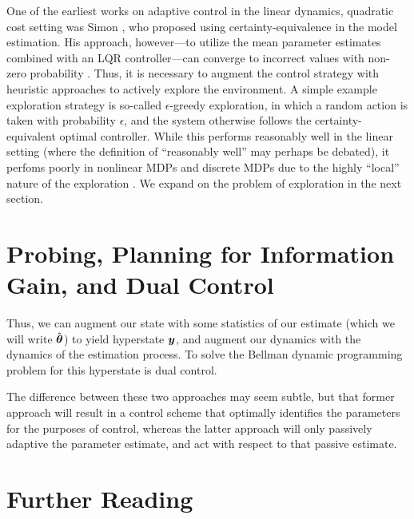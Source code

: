 One of the earliest works on adaptive control in the linear dynamics, quadratic cost setting was Simon \cite{simon1956dynamic}, who proposed using certainty-equivalence in the model estimation. His approach, however---to utilize the mean parameter estimates combined with an LQR controller---can converge to incorrect values with non-zero probability \cite{becker1985adaptive,abbasi2011regret}. Thus, it is necessary to augment the control strategy with heuristic approaches to actively explore the environment. A simple example exploration strategy is so-called $\epsilon$-greedy exploration, in which a random action is taken with probability $\epsilon$, and the system otherwise follows the certainty-equivalent optimal controller. While this performs reasonably well in the linear setting (where the definition of ``reasonably well'' may perhaps be debated), it perfoms poorly in nonlinear MDPs and discrete MDPs due to the highly ``local'' nature of the exploration \cite{moldovan2015optimism,osband2016generalization}. We expand on the problem of exploration in the next section. 




\section{Probing, Planning for Information Gain, and Dual Control}

Thus, we can augment our state with some statistics of our estimate (which we will write $\hat{\bm{\theta}}$) to yield hyperstate $\bm{y}$, and augment our dynamics with the dynamics of the estimation process. To solve the Bellman dynamic programming problem for this hyperstate is dual control. 

The difference between these two approaches may seem subtle, but that former approach will result in a control scheme that optimally identifies the parameters for the purposes of control, whereas the latter approach will only passively adaptive the parameter estimate, and act with respect to that passive estimate. 




\section{Further Reading}

